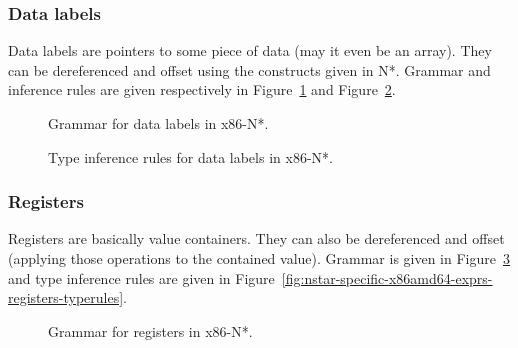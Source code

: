 \subsubsection{Data labels}\label{subsubsec:nstar-specific-x86amd64-exprs-labels}

Data labels are pointers to some piece of data (may it even be an array).
They can be dereferenced and offset using the constructs given in N*.
Grammar and inference rules are given respectively in Figure~\ref{fig:nstar-specific-x86amd64-exprs-labels-grammar} and Figure~\ref{fig:nstar-specific-x86amd64-exprs-labels-typerules}.

\begin{figure}[H]
  \centering

  \caption{Grammar for data labels in x86-N*.}
  \label{fig:nstar-specific-x86amd64-exprs-labels-grammar}
\end{figure}

\begin{figure}[H]
  \centering

  \begin{prooftree}
  \end{prooftree}

  \caption{Type inference rules for data labels in x86-N*.}
  \label{fig:nstar-specific-x86amd64-exprs-labels-typerules}
\end{figure}

\subsubsection{Registers}\label{subsubsec:nstar-specific-x86amd64-exprs-registers}

Registers are basically value containers.
They can also be dereferenced and offset (applying those operations to the contained value).
Grammar is given in Figure~\ref{fig:nstar-specific-x86amd64-exprs-registers-grammar} and type inference rules are given in Figure~\ref{fig:nstar-specific-x86amd64-exprs-registers-typerules}.

\begin{figure}[H]
  \centering

  \caption{Grammar for registers in x86-N*.}
  \label{fig:nstar-specific-x86amd64-exprs-registers-grammar}
\end{figure}

